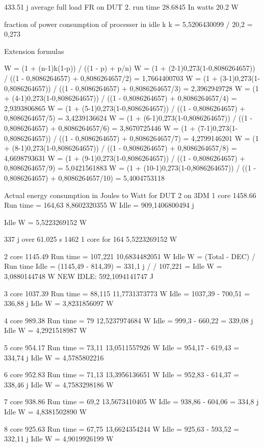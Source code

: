 433.51 j average full load FR on DUT 2.
run time 28.6845
In watts 20.2 W

fraction of power consumption of processer in idle k
k = 5,5206430099 / 20,2 = 0,273

Extension formulas

W = (1 + (n-1)k(1-p)) / ((1 - p) + p/n)
W = (1 + (2-1)0,273(1-0,8086264657)) / ((1 - 0,8086264657) + 0,8086264657/2) = 1,7664400703
W = (1 + (3-1)0,273(1-0,8086264657)) / ((1 - 0,8086264657) + 0,8086264657/3) = 2,3962949728
W = (1 + (4-1)0,273(1-0,8086264657)) / ((1 - 0,8086264657) + 0,8086264657/4) = 2,9393806865
W = (1 + (5-1)0,273(1-0,8086264657)) / ((1 - 0,8086264657) + 0,8086264657/5) = 3,4239136624
W = (1 + (6-1)0,273(1-0,8086264657)) / ((1 - 0,8086264657) + 0,8086264657/6) = 3,8670725446
W = (1 + (7-1)0,273(1-0,8086264657)) / ((1 - 0,8086264657) + 0,8086264657/7) = 4,2799146201
W = (1 + (8-1)0,273(1-0,8086264657)) / ((1 - 0,8086264657) + 0,8086264657/8) = 4,6698793631
W = (1 + (9-1)0,273(1-0,8086264657)) / ((1 - 0,8086264657) + 0,8086264657/9) = 5,0421561883
W = (1 + (10-1)0,273(1-0,8086264657)) / ((1 - 0,8086264657) + 0,8086264657/10) = 5,4004753118

Actual energy consumption in Joules to Watt for DUT 2 on 3DM
1 core 1458.66
Run time = 164,63
8,8602320355 W
Idle = 909,1406800494 j

Idle W = 5,5223269152 W

337 j over 61.025 s
1462 1 core for 164
5,5223269152 W 

2 core 1145.49
Run time = 107,221
10,6834482051 W
Idle W = (Total - DEC) / Run time
Idle = (1145,49 - 814,39) = 331,1  j / / 107,221 =
Idle W = 3,0880144748 W
NEW IDLE: 592,1094141747 J

3 core 1037.39
Run time = 88,115
11,7731373773 W
Idle = 1037,39 - 700,51 = 336,88 j
Idle W = 3,8231856097 W

4 core 989.38
Run time = 79
12,5237974684 W
Idle = 999,3 - 660,22 = 339,08 j
Idle W = 4,2921518987 W

5 core 954.17
Run time = 73,11
13,0511557926 W
Idle = 954,17 - 619,43 = 334,74 j
Idle W = 4,5785802216

6 core 952.83
Run time = 71,13
13,3956136651 W
Idle = 952,83 - 614,37 = 338,46 j
Idle W = 4,7583298186 W

7 core 938.86
Run time = 69,2
13,5673410405 W
Idle = 938,86 - 604,06 = 334,8 j
Idle W = 4,8381502890 W

8 core 925.63
Run time = 67,75
13,6624354244 W
Idle = 925,63 - 593,52 = 332,11 j
Idle W = 4,9019926199 W

